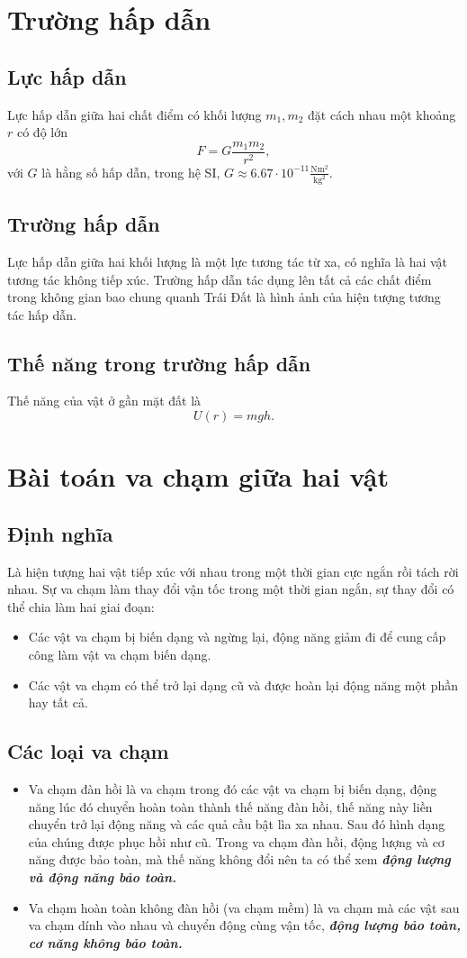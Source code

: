 \section{Trường hấp dẫn}
\subsection{Lực hấp dẫn}
Lực hấp dẫn giữa hai chất điểm có khối lượng $m_1, m_2$ đặt cách nhau một khoảng $r$ có độ lớn
$$F = G \frac{m_1 m_2}{r^2},$$
với $G$ là hằng số hấp dẫn, trong hệ SI, $G \approx 6.67 \cdot 10^{-11} \mathrm{\frac{Nm^2}{kg^2}}.$
\subsection{Trường hấp dẫn}
Lực hấp dẫn giữa hai khối lượng là một lực tương tác từ xa, có nghĩa là hai vật tương tác không tiếp xúc. Trường hấp dẫn tác dụng lên tất cả các chất điểm trong không gian bao chung quanh Trái Đất là hình ảnh của hiện tượng tương tác hấp dẫn.
\subsection{Thế năng trong trường hấp dẫn}
Thế năng của vật ở gần mặt đất là
$$U \left( r \right) = mgh.$$
\section{Bài toán va chạm giữa hai vật}
\subsection{Định nghĩa} 
Là hiện tượng hai vật tiếp xúc với nhau trong một thời gian cực ngắn rồi tách rời nhau. Sự va chạm làm thay đổi vận tốc trong một thời gian ngắn, sự thay đổi có thể chia làm hai giai đoạn:
\begin{itemize}
\item Các vật va chạm bị biến dạng và ngừng lại, động năng giảm đi để cung cấp công làm vật va chạm biến dạng.
\item Các vật va chạm có thể trở lại dạng cũ và được hoàn lại động năng một phần hay tất cả.
\end{itemize}
\subsection{Các loại va chạm}
\begin{itemize}
\item Va chạm đàn hồi là va chạm trong đó các vật va chạm bị biến dạng, động năng lúc đó chuyển hoàn toàn thành thế năng đàn hồi, thế năng này liền chuyển trở lại động năng và các quả cầu bật lìa xa nhau. Sau đó hình dạng của chúng được phục hồi như cũ. Trong va chạm đàn hồi, động lượng và cơ năng được bảo toàn, mà thế năng không đổi nên ta có thể xem \textbf{\textit{động lượng và động năng bảo toàn.}}
\item Va chạm hoàn toàn không đàn hồi (va chạm mềm) là va chạm mà các vật sau va chạm dính vào nhau và chuyển động cùng vận tốc, \textbf{\textit{động lượng bảo toàn, cơ năng không bảo toàn.}}
\end{itemize}
